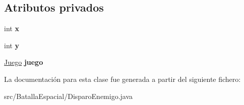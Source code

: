 \subsection*{Atributos privados}
\begin{DoxyCompactItemize}
\item 
\hypertarget{classBatallaEspacial_1_1DisparoEnemigo_a01941f1a77568e12cf9fa142fcfd2aab}{
int {\bfseries x}}
\label{classBatallaEspacial_1_1DisparoEnemigo_a01941f1a77568e12cf9fa142fcfd2aab}

\item 
\hypertarget{classBatallaEspacial_1_1DisparoEnemigo_ab22087ca658f35d680c86bd25ad18328}{
int {\bfseries y}}
\label{classBatallaEspacial_1_1DisparoEnemigo_ab22087ca658f35d680c86bd25ad18328}

\item 
\hypertarget{classBatallaEspacial_1_1DisparoEnemigo_aad347800753c7c5fbd4a447b102d90de}{
\hyperlink{classBatallaEspacial_1_1Juego}{Juego} {\bfseries juego}}
\label{classBatallaEspacial_1_1DisparoEnemigo_aad347800753c7c5fbd4a447b102d90de}

\end{DoxyCompactItemize}


La documentación para esta clase fue generada a partir del siguiente fichero:\begin{DoxyCompactItemize}
\item 
src/BatallaEspacial/DisparoEnemigo.java\end{DoxyCompactItemize}
